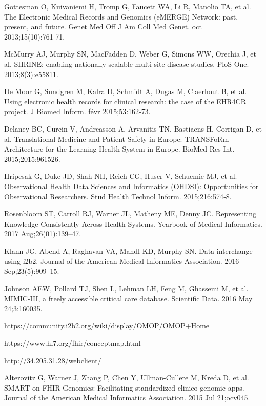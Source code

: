 \documentclass{amia}
\begin{document}

\begin{thebibliography}{1}
\setlength\itemsep{-0.1em}


Gottesman O, Kuivaniemi H, Tromp G, Faucett WA, Li R, Manolio TA, et al. The Electronic Medical Records and Genomics (eMERGE) Network: past, present, and future. Genet Med Off J Am Coll Med Genet. oct 2013;15(10):761‑71.

McMurry AJ, Murphy SN, MacFadden D, Weber G, Simons WW, Orechia J, et al. SHRINE: enabling nationally scalable multi-site disease studies. PloS One. 2013;8(3):e55811.

De Moor G, Sundgren M, Kalra D, Schmidt A, Dugas M, Claerhout B, et al. Using electronic health records for clinical research: the case of the EHR4CR project. J Biomed Inform. févr 2015;53:162‑73. 

Delaney BC, Curcin V, Andreasson A, Arvanitis TN, Bastiaens H, Corrigan D, et al. Translational Medicine and Patient Safety in Europe: TRANSFoRm--Architecture for the Learning Health System in Europe. BioMed Res Int. 2015;2015:961526. 

Hripcsak G, Duke JD, Shah NH, Reich CG, Huser V, Schuemie MJ, et al. Observational Health Data Sciences and Informatics (OHDSI): Opportunities for Observational Researchers. Stud Health Technol Inform. 2015;216:574‑8. 

Rosenbloom ST, Carroll RJ, Warner JL, Matheny ME, Denny JC. Representing Knowledge Consistently Across Health Systems. Yearbook of Medical Informatics. 2017 Aug;26(01):139–47. 

Klann JG, Abend A, Raghavan VA, Mandl KD, Murphy SN. Data interchange using i2b2. Journal of the American Medical Informatics Association. 2016 Sep;23(5):909–15. 

Johnson AEW, Pollard TJ, Shen L, Lehman LH, Feng M, Ghassemi M, et al. MIMIC-III, a freely accessible critical care database. Scientific Data. 2016 May 24;3:160035. 

https://community.i2b2.org/wiki/display/OMOP/OMOP+Home

https://www.hl7.org/fhir/conceptmap.html

http://34.205.31.28/webclient/

Alterovitz G, Warner J, Zhang P, Chen Y, Ullman-Cullere M, Kreda D, et al. SMART on FHIR Genomics: Facilitating standardized clinico-genomic apps. Journal of the American Medical Informatics Association. 2015 Jul 21;ocv045. 


\end{thebibliography}
\end{document}

